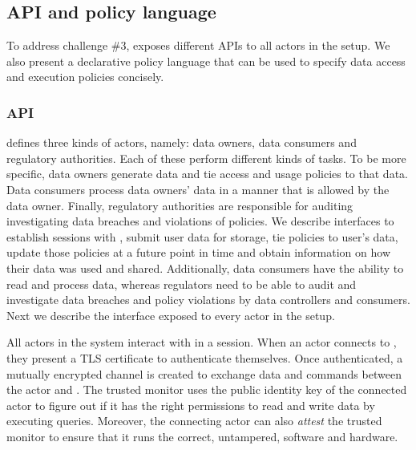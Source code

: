 
\subsection{\project{} API and policy language}
\label{sec:policylanguage}

To address challenge \#3, \project{} exposes different APIs to all actors in the setup. We also present a declarative policy language that can be used to specify data access and execution policies concisely.

\subsubsection{\project{} API}

\project{} defines three kinds of actors, namely: data owners, data consumers and regulatory authorities. Each of these perform different kinds of tasks. To be more specific, data owners generate data and tie access and usage policies to that data. Data consumers process data owners' data in a manner that is allowed by the data owner. Finally, regulatory authorities are responsible for auditing investigating data breaches and violations of policies. We describe interfaces to establish sessions with \project{}, submit user data for storage, tie policies to user's data, update those policies at a future point in time and obtain information on how their data was used and shared. Additionally, data consumers have the ability to read and process data, whereas regulators need to be able to audit and investigate data breaches and policy violations by data controllers and consumers. Next we describe the interface exposed to every actor in the setup.

All actors in the system interact with \project{} in a session. When an actor connects to \project{}, they present a TLS certificate to authenticate themselves. Once authenticated, a mutually encrypted channel is created to exchange data and commands between the actor and \project{}. The trusted monitor uses the public identity key of the connected actor to figure out if it has the right permissions to read and write data by executing queries. Moreover, the connecting actor can also \emph{attest} the trusted monitor to ensure that it runs the correct, untampered, software and hardware.

